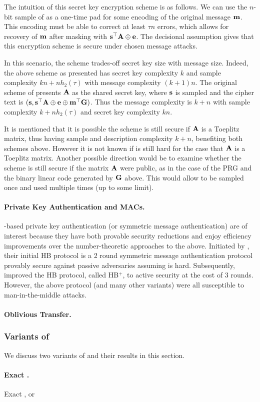 The intuition of this secret key encryption scheme is as follows.
We can use the $n$-bit sample of \LPN as a one-time pad for some encoding of the original message ${\mathbf m}$.
This encoding must be able to correct at least $\tau n $ errors, which allows for recovery of ${\mathbf m}$ after masking with ${\mathbf s}^\top {\mathbf A} \oplus {\mathbf e}$.
The decisional \LPN assumption gives that this encryption scheme is secure under chosen message attacks.

In this scenario, the scheme trades-off secret key size with message size.
Indeed, the above scheme as presented has secret key complexity $k$ and sample complexity $kn + nh_2(\tau)$ with message complexity $(k+1)n$.
The original scheme of \cite{ICALP:GilRobSeu08} presents ${\mathbf A}$ as the shared secret key, where ${\mathbf s}$ is sampled and the cipher text is $({\mathbf s}, {\mathbf s}^\top {\mathbf A} \oplus {\mathbf e} \oplus {\mathbf m}^\top{\mathbf G})$.
Thus the message complexity is $k + n$ with sample complexity $k + nh_2(\tau)$ and secret key complexity $kn$.

It is mentioned that it is possible the scheme is still secure if ${\mathbf A}$ is a Toeplitz matrix, thus having sample and description complexity $k+n$, benefiting both schemes above.
However it is not known if \LPN is still hard for the case that ${\mathbf A}$ is a Toeplitz matrix.
Another possible direction would be to examine whether the scheme is still secure if the matrix ${\mathbf A}$ were public, as in the case of the \LPN PRG and the binary linear code generated by ${\mathbf G}$ above.
This would allow \bA to be sampled once and used multiple times (up to some limit).

\paragraph{Private Key Authentication and MACs.} \LPN-based private key authentication (or symmetric message authentication) are of interest because they have both provable security reductions and enjoy efficiency improvements over the number-theoretic approaches to the above.
Initiated by \cite{AC:HopBlu01}, their initial HB protocol is a 2 round symmetric message authentication protocol provably secure against passive adversaries assuming \LPN is hard.
Subsequently, \cite{C:JueWei05} improved the HB protocol, called HB$^+$, to active security at the cost of 3 rounds. 
However, the above protocol (and many other variants) were all susceptible to man-in-the-middle attacks.

\paragraph{Oblivious Transfer.} \cite{EPRINT:DGMN08a}





\subsubsection{Variants of \LPN}
We discuss two variants of \LPN and their results in this section.

\paragraph{Exact \LPN.} Exact \LPN, or \XLPN








